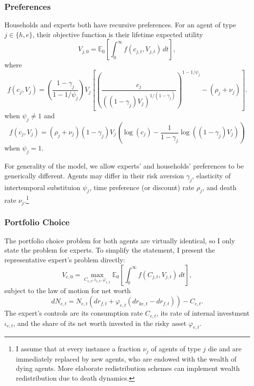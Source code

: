 \documentclass[12 pt, oneside]{article}
\theoremstyle{definition}
\theoremstyle{definition}
\theoremstyle{definition}
\newcommand{\E}{\mathbb{E}}
\begin{document}
\subsubsection{Preferences}
Households and experts both have recursive preferences. For an agent of type $j \in \{h, e\}$, their objective function is their lifetime expected utility
\begin{equation}
\label{eq:recursive preferences}
V_{j, 0} =   \E_0\left[\int_0^\infty f(c_{j, t}, V_{j, t})\, dt\right],
\end{equation}
where
\begin{equation}
  \label{eq:recursive aggregator}
f(c_j, V_j)  = \left(\frac{1 - \gamma_j}{1 - 1 / \psi_j} \right)V_j\left[\left(\frac{c_j}{((1 - \gamma_j)V_j)^{1 / (1 - \gamma_j)}}\right)^{1 - 1 / \psi_j} - (\rho_j + \nu_j)\right].
\end{equation}
when $\psi_j\neq 1$ and
\begin{equation}
  \label{eq:recursive aggregator psi_j = 1}
f(c_j, V_j)  = (\rho_j + \nu_j)(1 - \gamma_j)V_j\left(\log(c_j) - \frac{1}{1 - \gamma_j}\log((1 - \gamma_j)V_j)\right)
\end{equation}
when $\psi_j = 1$.

For generality of the model, we allow experts' and households' preferences to be generically different.
Agents may differ in their risk aversion $\gamma_j$, elasticity of intertemporal substituion $\psi_j$,
time preference (or discount) rate $\rho_j$, and
death rate $\nu_j$.\footnote{I assume that at every instance a fraction $\nu_j$ of agents of type $j$ die and are immediately replaced by new agents, who
are endowed with the wealth of dying agents. More elaborate redistribution schemes can implement wealth redistribution due to death dynamics.}

\subsubsection{Portfolio Choice}

The portfolio choice problem for both agents are virtually identical, so I only state the problem for experts. To simplify the statement,
I present the representative expert's problem directly:
\begin{equation*}
  V_{e, 0}  = \max_{C_{e, t}, \iota_{e, t}, \varphi_{e, t}} \E_0\left[\int_0^\infty f(C_{j, t}, V_{j, t})\, dt\right],
\end{equation*}
subject to the law of motion for net worth
\begin{equation}
\label{eq:expert net worth law of motion}
dN_{e, t}  = N_{e, t}(dr_{f, t} + \varphi_{e, t}(dr_{ke, t} - dr_{f, t})) - C_{e, t}.
\end{equation}
The expert's controls are its consumption rate $C_{e, t}$, its rate of internal investment $\iota_{e, t}$, and the share of its net worth
invested in the risky asset $\varphi_{e, t}$.
\end{document}
